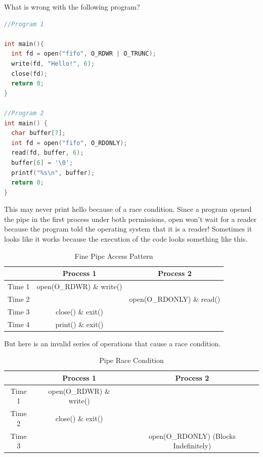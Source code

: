 What is wrong with the following program?

\begin{lstlisting}[language=C]
//Program 1

int main(){
  int fd = open("fifo", O_RDWR | O_TRUNC);
  write(fd, "Hello!", 6);
  close(fd);
  return 0;
}

//Program 2
int main() {
  char buffer[7];
  int fd = open("fifo", O_RDONLY);
  read(fd, buffer, 6);
  buffer[6] = '\0';
  printf("%s\n", buffer);
  return 0;
}
\end{lstlisting}

This may never print hello because of a race condition.
Since a program opened the pipe in the first process under both permissions, open won't wait for a reader because the program told the operating system that it is a reader!
Sometimes it looks like it works because the execution of the code looks something like this.

\begin{center}
\begin{table}[h]
\caption{Fine Pipe Access Pattern}
\begin{tabular}{|c|c|c|}
  & Process 1 & Process 2 \\ \hline
  Time 1 & open(O\_RDWR) \& write() & \\
  Time 2 & & open(O\_RDONLY) \& read() \\
  Time 3 & close() \& exit() & \\
  Time 4 & print() \& exit() & \\
\end{tabular}
\end{table}
\end{center}

But here is an invalid series of operations that cause a race condition.

\begin{center}
\begin{table}[h]
\caption{Pipe Race Condition}
\begin{tabular}{|c|c|c|}
  & Process 1 & Process 2 \\ \hline
  Time 1 & open(O\_RDWR) \& write() & \\
  Time 2 & close() \& exit() & \\
  Time 3 & & open(O\_RDONLY) (Blocks Indefinitely) \\
\end{tabular}
\end{table}
\end{center}


